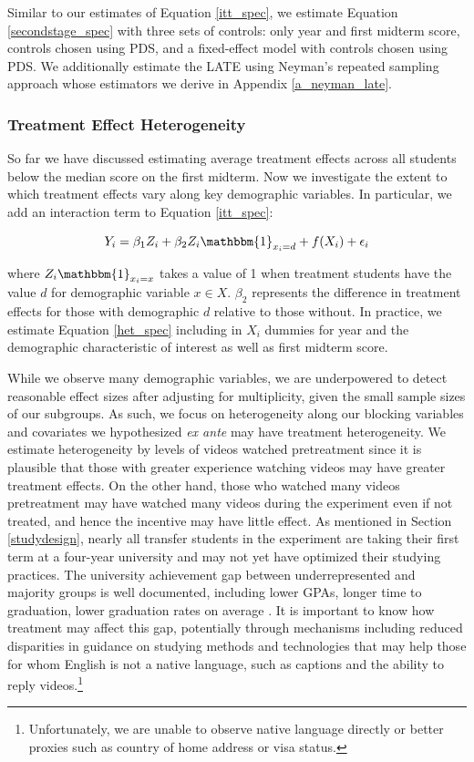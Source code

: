 \documentclass[12pt]{article}
\begin{document}
Similar to our estimates of Equation \ref{itt_spec}, we estimate Equation \ref{secondstage_spec} with three sets of controls: only year and first midterm score, controls chosen using PDS, and a fixed-effect model with controls chosen using PDS. We additionally estimate the LATE using Neyman's repeated sampling approach whose estimators we derive in Appendix \ref{a_neyman_late}.

\subsubsection{Treatment Effect Heterogeneity}

So far we have discussed estimating average treatment effects across all students below the median score on the first midterm. Now we investigate the extent to which treatment effects vary along key demographic variables. In particular, we add an interaction term to Equation \ref{itt_spec}:

\begin{equation} \label{het_spec}
	Y_i = \beta_1 Z_i + \beta_2 Z_i \mathbbm{1}_{x_i=d} + f(X_i) + \epsilon_i
\end{equation}

where $Z_i \mathbbm{1}_{x_i=x}$ takes a value of 1 when treatment students have the value $d$ for demographic variable $x \in X$. $\beta_2$ represents the difference in treatment effects for those with demographic $d$ relative to those without. In practice, we estimate Equation \ref{het_spec} including in $X_i$ dummies for year and the demographic characteristic of interest as well as first midterm score.

While we observe many demographic variables, we are underpowered to detect reasonable effect sizes after adjusting for multiplicity, given the small sample sizes of our subgroups. As such, we focus on heterogeneity along our blocking variables and covariates we hypothesized \textit{ex ante} may have treatment heterogeneity. We estimate heterogeneity by levels of videos watched pretreatment since it is plausible that those with greater experience watching videos may have greater treatment effects. On the other hand, those who watched many videos pretreatment may have watched many videos during the experiment even if not treated, and hence the incentive may have little effect. As mentioned in Section \ref{studydesign}, nearly all transfer students in the experiment are taking their first term at a four-year university and may not yet have optimized their studying practices. The university achievement gap between underrepresented and majority groups is well documented, including lower GPAs, longer time to graduation, lower graduation rates on average \parencite{bcm2009}. It is important to know how treatment may affect this gap, potentially through mechanisms including reduced disparities in guidance on studying methods and technologies that may help those for whom English is not a native language, such as captions and the ability to reply videos.\footnote{Unfortunately, we are unable to observe native language directly or better proxies such as country of home address or visa status.}
\end{document}
